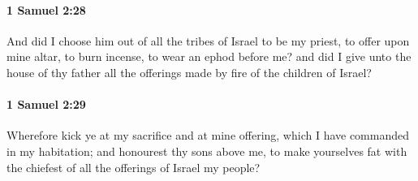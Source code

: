 		\paragraph{1 Samuel 2:28} %
			\label{1SAMUEL-2-28}

			And did I choose him out of all the tribes of Israel to be my priest, to offer upon mine altar, to burn incense, to wear an ephod before me? and did I give unto the house of thy father all the offerings made by fire of the children of Israel?


		\paragraph{1 Samuel 2:29} %
			\label{1SAMUEL-2-29}

			Wherefore kick ye at my sacrifice and at mine offering, which I have commanded in my habitation; and honourest thy sons above me, to make yourselves fat with the chiefest of all the offerings of Israel my people?

